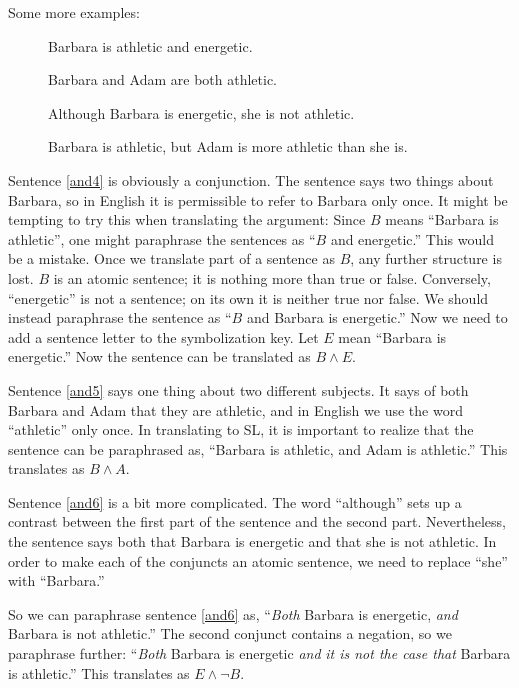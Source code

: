 Some more examples:
\begin{description}
\item[]Barbara is athletic and energetic.
\item[]Barbara and Adam are both athletic.
\item[]Although Barbara is energetic, she is not athletic.
\item[]Barbara is athletic, but Adam is more athletic than she is.
\end{description}

Sentence \ref{and4} is obviously a conjunction. The sentence says two things about Barbara, so in English it is permissible to refer to Barbara only once. It might be tempting to try this when translating the argument: Since $B$ means ``Barbara is athletic'', one might paraphrase the sentences as ``$B$ and energetic.'' This would be a mistake. Once we translate part of a sentence as $B$, any further structure is lost. $B$ is an atomic sentence; it is nothing more than true or false. Conversely, ``energetic'' is not a sentence; on its own it is neither true nor false. We should instead paraphrase the sentence as ``$B$ and Barbara is energetic.'' Now we need to add a sentence letter to the symbolization key. Let $E$ mean ``Barbara is energetic.'' Now the sentence can be translated as $B \land E$.

Sentence \ref{and5} says one thing about two different subjects. It says of both Barbara and Adam that they are athletic, and in English we use the word ``athletic'' only once. In translating to SL, it is important to realize that the sentence can be paraphrased as, ``Barbara is athletic, and Adam is athletic.'' This translates as $B \land A$.

Sentence \ref{and6} is a bit more complicated. The word ``although'' sets up a contrast between the first part of the sentence and the second part. Nevertheless, the sentence says both that Barbara is energetic and that she is not athletic. In order to make each of the conjuncts an atomic sentence, we need to replace ``she'' with ``Barbara.''

So we can paraphrase sentence \ref{and6} as, ``\emph{Both} Barbara is energetic, \emph{and} Barbara is not athletic.'' The second conjunct contains a negation, so we paraphrase further: ``\emph{Both} Barbara is energetic \emph{and} \emph{it is not the case that} Barbara is athletic.'' This translates as $E \land \lnot B$.

